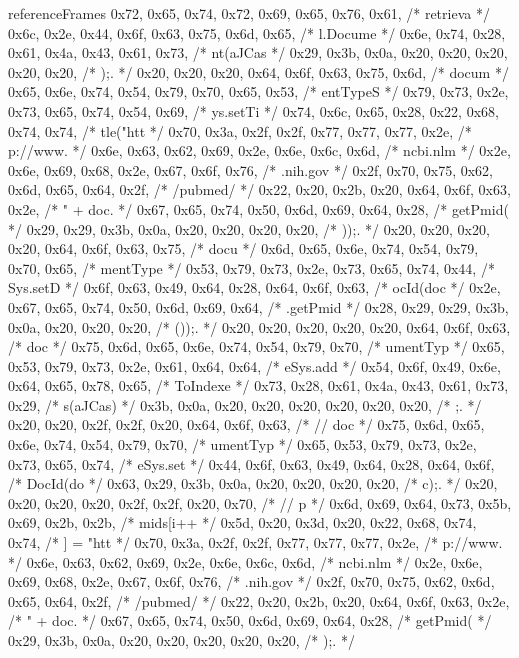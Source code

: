 \begin{chunk}{referenceFrames}
{{{{{{0x72, 0x65, 0x74, 0x72, 0x69, 0x65, 0x76, 0x61, /* retrieva */
0x6c, 0x2e, 0x44, 0x6f, 0x63, 0x75, 0x6d, 0x65, /* l.Docume */
0x6e, 0x74, 0x28, 0x61, 0x4a, 0x43, 0x61, 0x73, /* nt(aJCas */
0x29, 0x3b, 0x0a, 0x20, 0x20, 0x20, 0x20, 0x20, /* );.      */
0x20, 0x20, 0x20, 0x64, 0x6f, 0x63, 0x75, 0x6d, /*    docum */
0x65, 0x6e, 0x74, 0x54, 0x79, 0x70, 0x65, 0x53, /* entTypeS */
0x79, 0x73, 0x2e, 0x73, 0x65, 0x74, 0x54, 0x69, /* ys.setTi */
0x74, 0x6c, 0x65, 0x28, 0x22, 0x68, 0x74, 0x74, /* tle("htt */
0x70, 0x3a, 0x2f, 0x2f, 0x77, 0x77, 0x77, 0x2e, /* p://www. */
0x6e, 0x63, 0x62, 0x69, 0x2e, 0x6e, 0x6c, 0x6d, /* ncbi.nlm */
0x2e, 0x6e, 0x69, 0x68, 0x2e, 0x67, 0x6f, 0x76, /* .nih.gov */
0x2f, 0x70, 0x75, 0x62, 0x6d, 0x65, 0x64, 0x2f, /* /pubmed/ */
0x22, 0x20, 0x2b, 0x20, 0x64, 0x6f, 0x63, 0x2e, /* " + doc. */
0x67, 0x65, 0x74, 0x50, 0x6d, 0x69, 0x64, 0x28, /* getPmid( */
0x29, 0x29, 0x3b, 0x0a, 0x20, 0x20, 0x20, 0x20, /* ));.     */
0x20, 0x20, 0x20, 0x20, 0x64, 0x6f, 0x63, 0x75, /*     docu */
0x6d, 0x65, 0x6e, 0x74, 0x54, 0x79, 0x70, 0x65, /* mentType */
0x53, 0x79, 0x73, 0x2e, 0x73, 0x65, 0x74, 0x44, /* Sys.setD */
0x6f, 0x63, 0x49, 0x64, 0x28, 0x64, 0x6f, 0x63, /* ocId(doc */
0x2e, 0x67, 0x65, 0x74, 0x50, 0x6d, 0x69, 0x64, /* .getPmid */
0x28, 0x29, 0x29, 0x3b, 0x0a, 0x20, 0x20, 0x20, /* ());.    */
0x20, 0x20, 0x20, 0x20, 0x20, 0x64, 0x6f, 0x63, /*      doc */
0x75, 0x6d, 0x65, 0x6e, 0x74, 0x54, 0x79, 0x70, /* umentTyp */
0x65, 0x53, 0x79, 0x73, 0x2e, 0x61, 0x64, 0x64, /* eSys.add */
0x54, 0x6f, 0x49, 0x6e, 0x64, 0x65, 0x78, 0x65, /* ToIndexe */
0x73, 0x28, 0x61, 0x4a, 0x43, 0x61, 0x73, 0x29, /* s(aJCas) */
0x3b, 0x0a, 0x20, 0x20, 0x20, 0x20, 0x20, 0x20, /* ;.       */
0x20, 0x20, 0x2f, 0x2f, 0x20, 0x64, 0x6f, 0x63, /*   // doc */
0x75, 0x6d, 0x65, 0x6e, 0x74, 0x54, 0x79, 0x70, /* umentTyp */
0x65, 0x53, 0x79, 0x73, 0x2e, 0x73, 0x65, 0x74, /* eSys.set */
0x44, 0x6f, 0x63, 0x49, 0x64, 0x28, 0x64, 0x6f, /* DocId(do */
0x63, 0x29, 0x3b, 0x0a, 0x20, 0x20, 0x20, 0x20, /* c);.     */
0x20, 0x20, 0x20, 0x20, 0x2f, 0x2f, 0x20, 0x70, /*     // p */
0x6d, 0x69, 0x64, 0x73, 0x5b, 0x69, 0x2b, 0x2b, /* mids[i++ */
0x5d, 0x20, 0x3d, 0x20, 0x22, 0x68, 0x74, 0x74, /* ] = "htt */
0x70, 0x3a, 0x2f, 0x2f, 0x77, 0x77, 0x77, 0x2e, /* p://www. */
0x6e, 0x63, 0x62, 0x69, 0x2e, 0x6e, 0x6c, 0x6d, /* ncbi.nlm */
0x2e, 0x6e, 0x69, 0x68, 0x2e, 0x67, 0x6f, 0x76, /* .nih.gov */
0x2f, 0x70, 0x75, 0x62, 0x6d, 0x65, 0x64, 0x2f, /* /pubmed/ */
0x22, 0x20, 0x2b, 0x20, 0x64, 0x6f, 0x63, 0x2e, /* " + doc. */
0x67, 0x65, 0x74, 0x50, 0x6d, 0x69, 0x64, 0x28, /* getPmid( */
0x29, 0x3b, 0x0a, 0x20, 0x20, 0x20, 0x20, 0x20, /* );.      */
}}}}}}
\end{chunk}
